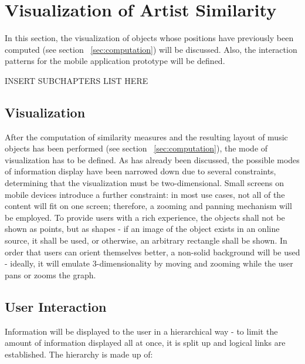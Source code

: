 \section{Visualization of Artist Similarity}
\label{sec:visualization}

In this section, the visualization of objects whose positions have previously been computed (see section ~\ref{sec:computation}) will be discussed. Also, the interaction patterns for the mobile application prototype will be defined.

INSERT SUBCHAPTERS LIST HERE

\subsection{Visualization}

After the computation of similarity measures and the resulting layout of music objects has been performed (see section ~\ref{sec:computation}), the mode of visualization has to be defined. As has already been discussed, the possible modes of information display have been narrowed down due to several constraints, determining that the visualization must be two-dimensional. Small screens on mobile devices introduce a further constraint: in most use cases, not all of the content will fit on one screen; therefore, a zooming and panning mechanism will be employed. To provide users with a rich experience, the objects shall not be shown as points, but as shapes - if an image of the object exists in an online source, it shall be used, or otherwise, an arbitrary rectangle shall be shown. In order that users can orient themselves better, a non-solid background will be used - ideally, it will emulate 3-dimensionality by moving and zooming while the user pans or zooms the graph.

\subsection{User Interaction}

Information will be displayed to the user in a hierarchical way - to limit the amount of information displayed all at once, it is split up and logical links are established. The hierarchy is made up of:

